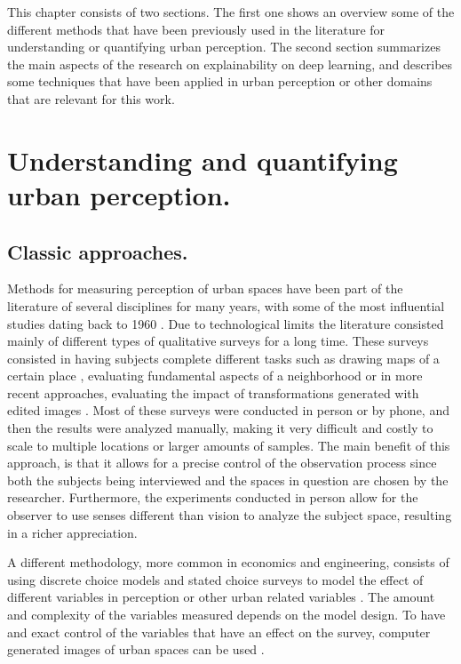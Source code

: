 This chapter consists of two sections. The first one shows an overview some of the
different methods that have been previously used in the literature
for understanding or quantifying urban perception.
The second section summarizes the main aspects of the research
on explainability on deep learning, and describes some techniques that have been applied
in urban perception or other domains that are relevant for this work.


\section{Understanding and quantifying urban perception.}

\subsection{Classic approaches.}
Methods for measuring perception of urban spaces have been part of the literature of several
disciplines for many years,  with some of the most influential studies dating back to 1960
\cite{lynch}. Due to technological limits the literature consisted mainly of different types of
qualitative surveys for a long time. These surveys consisted in having subjects complete
different tasks such as drawing maps of a certain place \cite{lynch}, evaluating fundamental
aspects of a neighborhood \cite{nasar_perception} or in more recent approaches, evaluating
the impact of transformations generated with edited images \cite{jiang_minimizing}. Most of
these surveys were conducted in person or by phone, and then the results were analyzed manually,
making it very difficult and costly to scale to multiple locations or larger amounts of samples.
The main benefit of this approach, is that it allows for a precise control of the observation process
since both the subjects being interviewed and the spaces in question are chosen by the researcher.
Furthermore, the experiments conducted in person allow for the observer to use senses different
than vision to analyze the subject space, resulting in a richer appreciation.

A different methodology, more common in economics and engineering, consists of using discrete choice models
and stated choice surveys to model the effect of different variables in perception or other urban
related variables  \cite{rose_sc, iglesias_perception, torres_housing}. The amount and complexity of the
variables measured depends on the model design. To have and exact control of the variables that
have an effect on the survey, computer generated images of urban spaces can be used
\cite{iglesias_perception,torres_housing}.

